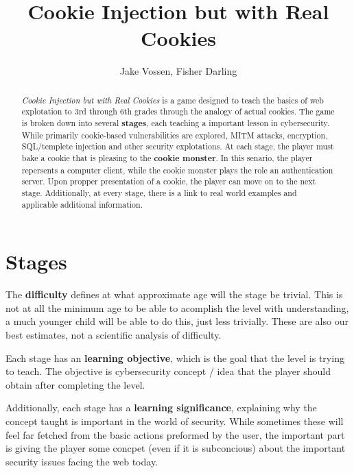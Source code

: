 \documentclass{article}
\begin{document}
\title{Cookie Injection but with Real Cookies}
\author{Jake Vossen, Fisher Darling}

\maketitle

\begin{abstract}
  
\textit{Cookie Injection but with Real Cookies} is a
game designed to teach the basics of web explotation to 3rd through
6th grades through the analogy of actual cookies. The game is broken
down into several \textbf{stages}, each teaching a important lesson in
cybersecurity. While primarily cookie-based vulnerabilities are
explored, MITM attacks, encryption, SQL/templete injection and other
security explotations. At each stage, the player must bake a cookie
that is pleasing to the \textbf{cookie monster}. In this senario, the
player repersents a computer client, while the cookie monster plays
the role an authentication server. Upon propper presentation of a
cookie, the player can move on to the next stage. Additionally, at
every stage, there is a link to real world examples and applicable
additional information.

\end{abstract}

\section{Stages}

The \textbf{difficulty} defines at what approximate age will the stage
be trivial. This is not at all the minimum age to be able to acomplish
the level with understanding, a much younger child will be able to do
this, just less trivially. These are also our best estimates, not a
scientific analysis of difficulty.

Each stage has an \textbf{learning objective}, which is the goal that
the level is trying to teach. The objective is cybersecurity concept /
idea that the player should obtain after completing the level.

Additionally, each stage has a \textbf{learning significance},
explaining why the concept taught is important in the world of
security. While sometimes these will feel far fetched from the basic
actions preformed by the user, the important part is giving the player
some concpet (even if it is subconcious) about the important security
issues facing the web today.
\end{document}
